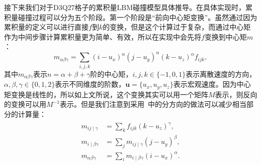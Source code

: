 接下来我们对于D3Q27格子的累积量LBM碰撞模型具体推导。在具体实现时，累积量碰撞过程可以分为五个阶段。第一个阶段是“前向中心矩变换”。虽然通过因为累积量的定义可以进行直接$f$到$k$的变换，但是这个计算过于复杂，而通过中心矩作为中间步骤计算累积量更为简单、有效，所以在实现中会先将$f$变换到中心矩$m$：
\begin{equation}
m_{\alpha \beta \gamma} =\sum_{i,j,k} (i-u_x)^{\alpha} (j-u_y)^{\alpha} (k-u_z)^{\alpha} f_{ijk},
\end{equation}
其中$m_{\alpha \beta \gamma}$表示$n=\alpha+\beta+\gamma$阶的中心矩，$i, j, k \in \{-1, 0, 1\}$表示离散速度的方向，$\alpha, \beta, \gamma \in \{0, 1, 2\}$表示不同维度的阶数，$\boldsymbol{u}=\{u_x, u_y, u_z\}$表示宏观速度。因为中心矩变换是线性的，所以如上文所说，这个变换其实可以用一个矩阵$M$表示，则反向的变换可以用$M^{-1}$表示。但是我们注意到采用~\citep{Geier-2015}中的分方向的做法可以减少相当部分的计算量：
\begin{align}
    \begin{split}
m_{i j \mid \gamma} & =\sum_{k} f_{ijk}(k-u_z)^{\gamma}, \\
m_{i \mid \beta \gamma} & =\sum_{j} m_{i j \mid \gamma}(j-u_y)^{\beta}, \\
m_{\alpha \beta \gamma} & =\sum_{i} m_{i \mid \beta \gamma}(i-u_x)^{\alpha}.
\end{split}
\end{align}

